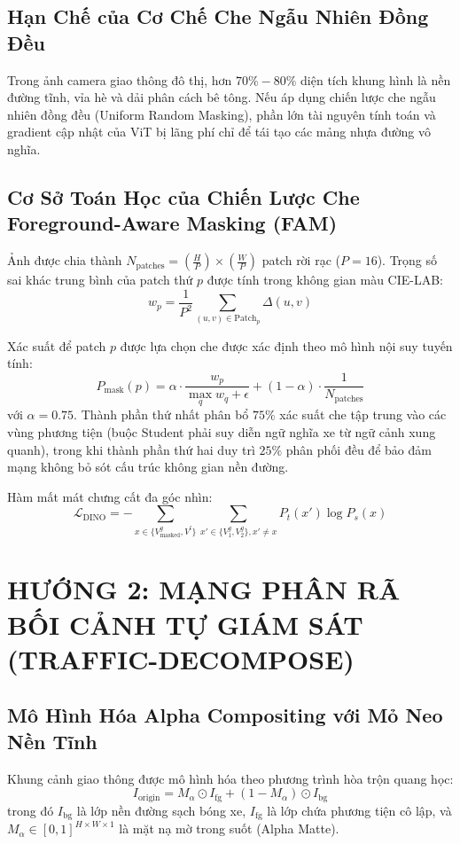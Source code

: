 \documentclass[11pt,a4paper]{article}
\begin{document}
\subsection{Hạn Chế của Cơ Chế Che Ngẫu Nhiên Đồng Đều}
Trong ảnh camera giao thông đô thị, hơn $70\% - 80\%$ diện tích khung hình là nền đường tĩnh, vỉa hè và dải phân cách bê tông. Nếu áp dụng chiến lược che ngẫu nhiên đồng đều (Uniform Random Masking), phần lớn tài nguyên tính toán và gradient cập nhật của ViT bị lãng phí chỉ để tái tạo các mảng nhựa đường vô nghĩa.

\subsection{Cơ Sở Toán Học của Chiến Lược Che Foreground-Aware Masking (FAM)}
Ảnh được chia thành $N_{\text{patches}} = \left(\frac{H}{P}\right) \times \left(\frac{W}{P}\right)$ patch rời rạc ($P=16$). Trọng số sai khác trung bình của patch thứ $p$ được tính trong không gian màu CIE-LAB:
\begin{equation}
    w_p = \frac{1}{P^2} \sum_{(u, v) \in \text{Patch}_p} \Delta(u, v)
\end{equation}

Xác suất để patch $p$ được lựa chọn che được xác định theo mô hình nội suy tuyến tính:
\begin{equation}
    P_{\text{mask}}(p) = \alpha \cdot \frac{w_p}{\max_{q} w_q + \epsilon} + (1 - \alpha) \cdot \frac{1}{N_{\text{patches}}}
\end{equation}
với $\alpha = 0.75$. Thành phần thứ nhất phân bổ $75\%$ xác suất che tập trung vào các vùng phương tiện (buộc Student phải suy diễn ngữ nghĩa xe từ ngữ cảnh xung quanh), trong khi thành phần thứ hai duy trì $25\%$ phân phối đều để bảo đảm mạng không bỏ sót cấu trúc không gian nền đường.

Hàm mất mát chưng cất đa góc nhìn:
\begin{equation}
    \mathcal{L}_{\text{DINO}} = -\sum_{x \in \{V^g_{\text{masked}}, V^l\}} \sum_{x' \in \{V_1^g, V_2^g\}, x' \neq x} P_t(x') \log P_s(x)
\end{equation}

\section{HƯỚNG 2: MẠNG PHÂN RÃ BỐI CẢNH TỰ GIÁM SÁT (TRAFFIC-DECOMPOSE)}

\subsection{Mô Hình Hóa Alpha Compositing với Mỏ Neo Nền Tĩnh}
Khung cảnh giao thông được mô hình hóa theo phương trình hòa trộn quang học:
\begin{equation}
    I_{\text{origin}} = M_{\alpha} \odot I_{\text{fg}} + (1 - M_{\alpha}) \odot I_{\text{bg}}
\end{equation}
trong đó $I_{\text{bg}}$ là lớp nền đường sạch bóng xe, $I_{\text{fg}}$ là lớp chứa phương tiện cô lập, và $M_{\alpha} \in [0, 1]^{H \times W \times 1}$ là mặt nạ mờ trong suốt (Alpha Matte).
\end{document}
